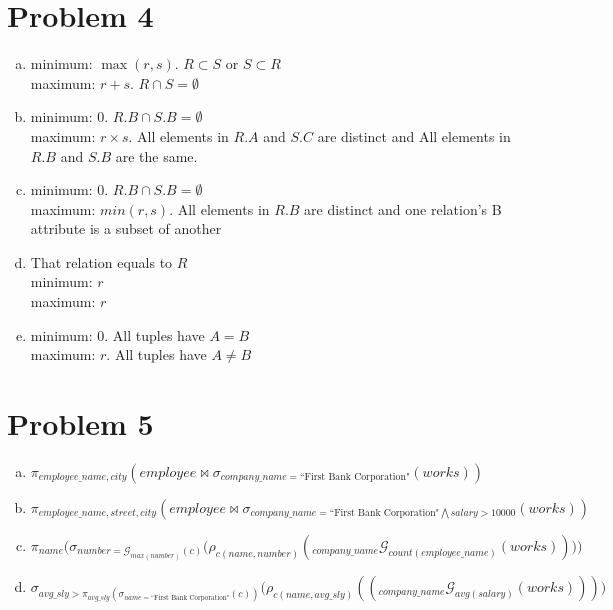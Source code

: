 \documentclass[12pt]{article}
\begin{document}
\section*{Problem 4}
\begin{enumerate}[a.]
\item
minimum: $\max(r, s)$. $R\subset S$ or $S\subset R$\\
maximum: $r+s$. $R\cap S = \emptyset$
\item
minimum: $0$. $R.B\cap S.B=\emptyset$\\
maximum: $r\times s$. All elements in $R.A$ and $S.C$ are distinct and All elements in $R.B$ and $S.B$ are the same.
\item
minimum: $0$. $R.B \cap S.B = \emptyset$\\
maximum: $min(r, s)$. All elements in $R.B$ are distinct and one relation's B attribute is a subset of another
\item
That relation equals to $R$\\
minimum:  $r$\\
maximum: $r$
\item
minimum: $0$. All tuples have $A=B$\\
maximum: $r$. All tuples have $A\neq B$
\end{enumerate}

\section*{Problem 5}
\begin{enumerate}[a.]
\item
$\pi_{employee\_name, city}\left(employee \bowtie \sigma_{company\_name=\text{``First Bank Corporation"}}(works)\right)$
\item
$\pi_{employee\_name, street, city}\left(employee \bowtie \sigma_{company\_name=\text{``First Bank Corporation"}\bigwedge salary>10000}(works)\right)$
\item
$\pi_{name}\Big(\sigma_{number = \mathcal{G}_{max(number)}(c)}\big(\rho_{c(name,number)}\left(_{company\_name}\mathcal{G}_{count(employee\_name)}(works)\right)\big)\Big)$
\item
$\sigma_{avg\_sly>\pi_{avg\_sly}(\sigma_{name=\text{``First Bank Corporation"}}(c))}\Big(\rho_{c(name, avg\_sly)}\left(\left(_{company\_name}\mathcal{G}_{avg(salary)}(works)\right)\right)\Big)$
\end{enumerate}
\end{document}
